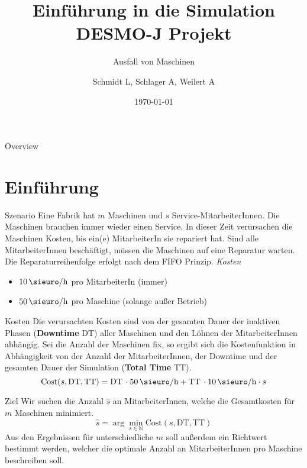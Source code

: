 \documentclass{beamer}
\title{Einführung in die Simulation\\DESMO-J Projekt}
\subtitle{Ausfall von Maschinen}
\author{Schmidt L, Schlager A, Weilert A}
\institute{Paris Lodron Universität Salzburg}
\date{\today}
\begin{document}
    \maketitle

    \begin{frame}{Overview}
        \tableofcontents
    \end{frame}

    \section{Einführung}
    \begin{frame}{Szenario}
        Eine Fabrik hat $m$ Maschinen und $s$ Service-MitarbeiterInnen.
        Die Maschinen brauchen immer wieder einen Service.
        In dieser Zeit verursachen die Maschinen Kosten, bis ein(e) MitarbeiterIn sie repariert hat.
        Sind alle MitarbeiterInnen beschäftigt,
        müssen die Maschinen auf eine Reparatur warten.
        Die Reparaturreihenfolge erfolgt nach dem FIFO Prinzip.\vspace*{1em}\newline
        \textit{Kosten}
        \begin{itemize}
            \item $\SI{10}{\sieuro\per\hour}$ pro MitarbeiterIn (immer)
            \item $\SI{50}{\sieuro\per\hour}$ pro Maschine (solange außer Betrieb)
        \end{itemize}
    \end{frame}

    \begin{frame}{Kosten}
        Die verursachten Kosten sind von der gesamten Dauer der inaktiven Phasen (\textbf{Downtime} DT) aller Maschinen und den
        Löhnen der MitarbeiterInnen abhängig.
        Sei die Anzahl der Maschinen fix, so ergibt sich die Kostenfunktion in Abhängigkeit von der Anzahl der MitarbeiterInnen,
        der Downtime und der gesamten Dauer der Simulation (\textbf{Total Time} TT).
        \[
            \mathrm{Cost}(s, \text{DT}, \text{TT}) = \text{DT}\,\cdot \SI{50}{\sieuro\per\hour} + \text{TT}\,\cdot \SI{10}{\sieuro\per\hour} \cdot s
        \]
    \end{frame}

    \begin{frame}{Ziel}
        Wir suchen die Anzahl $\hat{s}$ an MitarbeiterInnen, welche die Gesamtkosten für $m$ Maschinen minimiert.
        \[
             \hat{s} = \arg\min_{s \in \mathbb{N}} \mathrm{Cost}(s, \text{DT}, \text{TT})
        \]
        Aus den Ergebnissen für unterschiedliche $m$ soll außerdem ein Richtwert bestimmt werden, welcher
        die optimale Anzahl an MitarbeiterInnen pro Maschine beschreiben soll.
    \end{frame}
\end{document}
